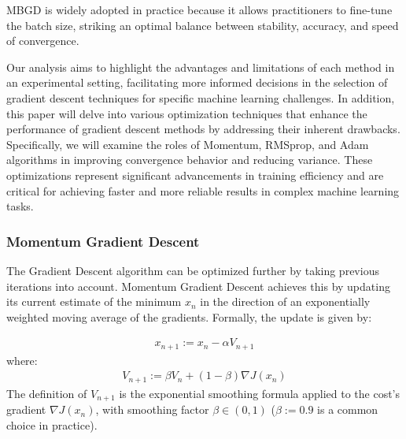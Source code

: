 MBGD is widely adopted in practice because it allows practitioners to fine-tune the batch size, striking an optimal balance between stability, accuracy, and speed of convergence.

Our analysis aims to highlight the advantages and limitations of each method in an experimental setting, facilitating more informed decisions in the selection of gradient descent techniques for specific machine learning challenges. In addition, this paper will delve into various optimization techniques that enhance the performance of gradient descent methods by addressing their inherent drawbacks. Specifically, we will examine the roles of Momentum, RMSprop, and Adam algorithms in improving convergence behavior and reducing variance. These optimizations represent significant advancements in training efficiency and are critical for achieving faster and more reliable results in complex machine learning tasks.


\subsubsection{Momentum Gradient Descent}
The Gradient Descent algorithm can be optimized further by taking previous iterations into account. Momentum Gradient Descent achieves this by updating its current estimate of the minimum $x_n$ in the direction of an exponentially weighted moving average of the gradients.
Formally, the update is given by:

\begin{align*}
    x_{n+1} := x_n - \alpha V_{n+1}
\end{align*} 
where:
\begin{align*}
    V_{n+1} := \beta V_n + (1-\beta) \nabla J(x_{n})
\end{align*} 
 The definition of $V_{n+1}$ is the exponential smoothing formula applied to the cost's gradient $\nabla J(x_{n})$, with smoothing factor $\beta \in (0,1)$ ($\beta:=0.9$ is a common choice in practice).


